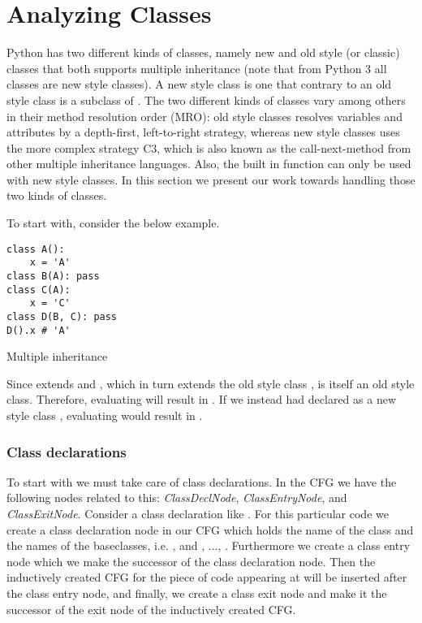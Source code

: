 \chapter{Analyzing Classes}
Python has two different kinds of classes, namely new and old style (or classic) classes that both supports multiple inheritance (note that from Python 3 all classes are new style classes). A new style class is one that contrary to an old style class is a subclass of . The two different kinds of classes vary among others in their method resolution order (MRO)\cite{pyref.typehierarchy}: old style classes resolves variables and attributes by a depth-first, left-to-right strategy, whereas new style classes uses the more complex strategy C3\cite{pyref.c3mro}, which is also known as the call-next-method from other multiple inheritance languages. Also, the built in function  can only be used with new style classes. In this section we present our work towards handling those two kinds of classes.

To start with, consider the below example.

\begin{listing}[H]
	\begin{verbatim}
class A():
	x = 'A'
class B(A): pass
class C(A):
	x = 'C'
class D(B, C): pass
D().x # 'A'
	\end{verbatim}
	\caption{Multiple inheritance}\label{code:OldStyleMROExample}
\end{listing}

Since  extends  and , which in turn extends the old style class ,  is itself an old style class. Therefore, evaluating  will result in . If we instead had declared  as a new style class , evaluating  would result in .


\subsection{Class declarations}
To start with we must take care of class declarations. In the CFG we have the following nodes related to this: \textit{ClassDeclNode}, \textit{ClassEntryNode}, and \textit{ClassExitNode}. Consider a class declaration like . For this particular code we create a class declaration node in our CFG which holds the name of the class and the names of the baseclasses, i.e. , and , ..., . Furthermore we create a class entry node which we make the successor of the class declaration node. Then the inductively created CFG for the piece of code appearing at  will be inserted after the class entry node, and finally, we create a class exit node and make it the successor of the exit node of the inductively created  CFG.

